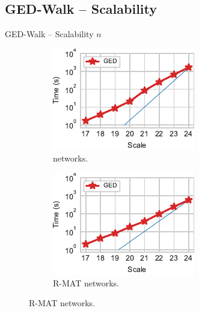 \documentclass[10pt,titlepage,english,presentation]{beamer}
\begin{document}
\subsection{GED-Walk -- Scalability}

\begin{frame}[t]{GED-Walk -- Scalability \wrt $n$}
\begin{figure}
\begin{subfigure}[t]{.5\textwidth}
\centering
\includegraphics[width=.7\textwidth]{../sources/plots/ged-walk/ER_scalability.pdf}
\caption*{\scriptsize \erdosr networks.}
\end{subfigure}\hfill
\begin{subfigure}[t]{.5\textwidth}
\centering
\includegraphics[width=.7\textwidth]{../sources/plots/ged-walk/RMAT_scalability.pdf}
\caption*{\scriptsize R-MAT networks.}
\end{subfigure}\smallskip


\end{figure}
\end{frame}
\end{document}
